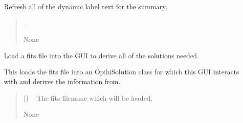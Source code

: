 \documentclass[letterpaper,11pt,english]{sphinxmanual}
\begin{document}
\begin{savenotes}
\begin{fulllineitems}
\begin{savenotes}\begin{fulllineitems}
\label{\detokenize{code/opihiexarata.gui.manual:opihiexarata.gui.manual.OpihiManualWindow.__refresh_dynamic_label_text_summary}}
\pysigstartsignatures
{}
\pysigstopsignatures
\sphinxAtStartPar
Refresh all of the dynamic label text for the summary.
\begin{quote}\begin{description}
\sphinxAtStartPar
{} – 

\sphinxAtStartPar
None

\end{description}\end{quote}

\end{fulllineitems}\end{savenotes}


\begin{savenotes}\begin{fulllineitems}
\label{\detokenize{code/opihiexarata.gui.manual:opihiexarata.gui.manual.OpihiManualWindow._load_fits_file}}
\pysigstartsignatures
{}
\pysigstopsignatures
\sphinxAtStartPar
Load a fits file into the GUI to derive all of the solutions needed.

\sphinxAtStartPar
This loads the fits file into an OpihiSolution class for which this
GUI interacts with and derives the information from.
\begin{quote}\begin{description}
\sphinxAtStartPar
{} () – The fits filename which will be loaded.

\sphinxAtStartPar
None

\end{description}\end{quote}


\end{fulllineitems}
\end{savenotes}
\end{fulllineitems}
\end{savenotes}
\end{document}
